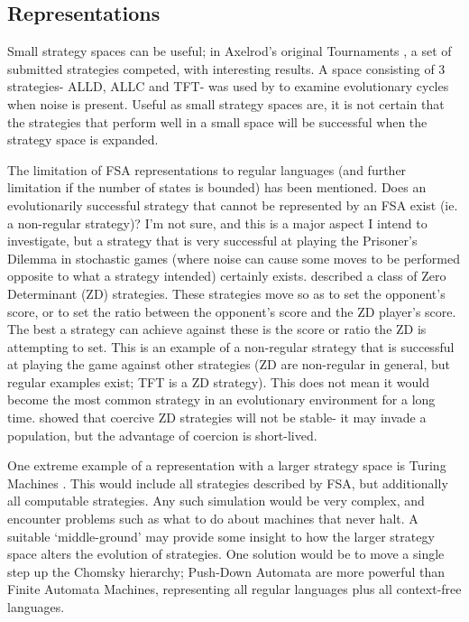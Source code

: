 \documentclass[a4paper,11pt]{article}
\begin{document}
\subsection{Representations}
Small strategy spaces can be useful; in Axelrod's original Tournaments \citep{axelrod:Science:1981}, a set of submitted strategies competed, with interesting results. 
A space consisting of 3 strategies- ALLD, ALLC and TFT- was used by \cite{imhof:PNAS:2005} to examine evolutionary cycles when noise is present. 
Useful as small strategy spaces are, it is not certain that the strategies that perform well in a small space will be successful when the strategy space is expanded.

The limitation of FSA representations to regular languages (and further limitation if the number of states is bounded) has been mentioned. 
Does an evolutionarily successful strategy that cannot be represented by an FSA exist (ie. a non-regular strategy)?
I'm not sure, and this is a major aspect I intend to investigate, but a strategy that is very successful at playing the Prisoner's Dilemma in stochastic games (where noise can cause some moves to be performed opposite to what a strategy intended) certainly exists. 
\citet{press2012iterated} described a class of Zero Determinant (ZD) strategies. 
These strategies move so as to set the opponent's score, or to set the ratio between the opponent's score and the ZD player's score. 
The best a strategy can achieve against these is the score or ratio the ZD is attempting to set. 
This is an example of a non-regular strategy that is successful at playing the game against other strategies (ZD are non-regular in general, but regular examples exist; TFT is a ZD strategy). 
This does not mean it would become the most common strategy in an evolutionary environment for a long time. \citet{adami2013evolutionary} showed that coercive ZD strategies will not be stable- it may invade a population, but the advantage of coercion is short-lived. 
 
One extreme example of a representation with a larger strategy space is Turing Machines \citep{Sipser2006}. 
This would include all strategies described by FSA, but additionally all computable strategies. 
Any such simulation would be very complex, and encounter problems such as what to do about machines that never halt.
A suitable `middle-ground' may provide some insight to how the larger strategy space alters the evolution of strategies. One solution would be to move a single step up the Chomsky hierarchy; Push-Down Automata are more powerful than Finite Automata Machines, representing all regular languages plus all context-free languages. 
\end{document}
